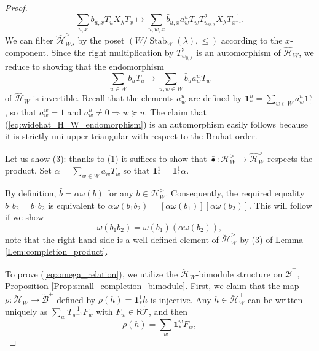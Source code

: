 \documentclass{amsart}
\newcommand{\Hecke}{\mathcal{H}}
\newcommand{\Ring}{\mathsf{R}}
\newcommand{\bone}{\mathbf{1}}
\newcommand{\B}{\mathcal{B}}
\theoremstyle{definition}
\numberwithin{equation}{section}
\begin{document}
\begin{proof}
\begin{equation}\label{eq:bar_top_layer}
\sum_{u,x}b_{u,x}T_u X_\lambda T_x\mapsto \sum_{u,w,x}\bar{b}_{u,x} a_w^u T_wT_{w_{0,\lambda}}^2 X_\lambda T^{-1}_{x^{-1}}.
\end{equation}
We can filter $\widehat{\mathcal{H}}^>_{W\lambda}$ by the poset $(W/\operatorname{Stab}_W(\lambda),\leqslant)$ according to the $x$-component. Since the right multiplication by $T_{w_{0,\lambda}}^2$ is an  automorphism of $\widehat{\mathcal{H}}_W$, we reduce to showing that the endomorphism 
\begin{equation}\label{eq:widehat_H_W_endomorphism}
\sum_{u\in W}b_u T_u\mapsto \sum_{u,w\in W}\bar{b}_u a^u_w T_w 
\end{equation}
of $\widehat{\mathcal{H}}_W$ is invertible. Recall that the elements $a^u_w$ are defined by $\bone^u_*=\sum_{w\in W}a_w^u \bone^w_!$, so that $a_w^w=1$ and $a_{w}^u\neq 0\Rightarrow w\succeq u$. The claim that (\ref{eq:widehat_H_W_endomorphism}) is an automorphism easily follows because it is strictly uni-upper-triangular with respect to the Bruhat order. 


Let us show (3): thanks to (1) it suffices to show that $\bar{\bullet}:\Hecke^>_W\rightarrow \widehat{\Hecke}^>_W$ respects the product.  Set $\alpha=\sum_{w\in W}a_w T_{w}$ so that $\bone_*^1 = \bone_!^1\alpha$.



By definition, $\bar{b}=\alpha \omega(b)$ for any $b\in \Hecke_W^{>}$.
Consequently, the required equality $\overline{b_1b_2}=\bar{b}_1\bar{b}_2$ is equivalent to $\alpha \omega(b_1b_2) = [\alpha \omega(b_1)][ \alpha \omega(b_2)]$. This will follow if we show
\begin{equation}\label{eq:omega_relation}
\omega(b_1b_2) = \omega(b_1)(\alpha \omega(b_2)),
\end{equation}
note that the right hand side is a well-defined element of $\breve{\Hecke}^>_W$ by (3) of Lemma \ref{Lem:completion_product}.

To prove (\ref{eq:omega_relation}), we utilize the $\breve{\Hecke}^+_W$-bimodule structure on $\breve{\B}^+$, Proposition \ref{Prop:small_completion_bimodule}. First, we claim that the map $\rho: \breve{\Hecke}_W^+ \to \breve{\B}^+$ defined by $\rho(h) = \bone_*^1 h$ is injective. Any $h \in \breve{\Hecke}_W^+$ can be written uniquely as $\sum_{w} T^{-1}_{w^{-1}} F_w$ with $F_w \in \Ring\breve{\mathcal{T}}$, and then
\[
\rho(h)=\sum_w \bone_*^w F_w,
\]


\end{proof}
\end{document}
